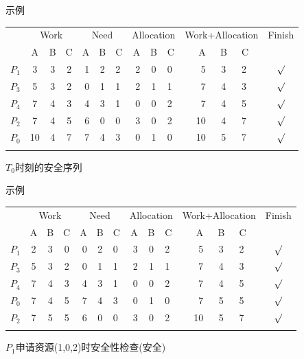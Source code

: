 \begin{frame}[fragile]{示例}
 \begin{center}
    \begin{tabular}{|c| c c c | r c l  |r c l |r c l | c |}
      \Xhline{1.1pt}
      ~ &  \multicolumn{3}{|c|}{Work} &  \multicolumn{3}{|c|}{Need} &  \multicolumn{3}{|c|}{Allocation} &  \multicolumn{3}{|c|}{Work+Allocation} & Finish \\ \cline{2-13}
      ~     & A  & B & C   &   A & B & C    &    A & B & C    &    A & B & C & \\ \Xhline{1pt}
      $P_1$ &  3 & 3 & 2   &   1 & 2 & 2    &    2 & 0 & 0    &    5 & 3 & 2 & $\surd$ \\ \hline
      $P_3$ &  5 & 3 & 2   &   0 & 1 & 1    &    2 & 1 & 1    &    7 & 4 & 3 & $\surd$ \\ \hline
      $P_4$ &  7 & 4 & 3   &   4 & 3 & 1    &    0 & 0 & 2    &    7 & 4 & 5 & $\surd$ \\ \hline
      $P_2$ &  7 & 4 & 5   &   6 & 0 & 0    &    3 & 0 & 2    &   10 & 4 & 7 & $\surd$ \\ \hline
      $P_0$ & 10 & 4 & 7   &   7 & 4 & 3    &    0 & 1 & 0    &   10 & 5 & 7 & $\surd$ \\ 
      \Xhline{1.1pt}
    \end{tabular}

    $T_0$时刻的安全序列
  \end{center}
\end{frame}


\begin{frame}[fragile]{示例}
 \begin{center}
    \begin{tabular}{|c| c c c | r c l  |r c l |r c l | c |}
      \Xhline{1.1pt}
      ~ &  \multicolumn{3}{|c|}{Work} &  \multicolumn{3}{|c|}{Need} &  \multicolumn{3}{|c|}{Allocation} &  \multicolumn{3}{|c|}{Work+Allocation} & Finish \\ \cline{2-13}
      ~     & A  & B & C   &   A & B & C    &    A & B & C    &    A & B & C & \\ \Xhline{1pt}
      $P_1$ &  2 & 3 & 0   &   0 & 2 & 0    &    3 & 0 & 2    &    5 & 3 & 2 & $\surd$ \\ \hline
      $P_3$ &  5 & 3 & 2   &   0 & 1 & 1    &    2 & 1 & 1    &    7 & 4 & 3 & $\surd$ \\ \hline
      $P_4$ &  7 & 4 & 3   &   4 & 3 & 1    &    0 & 0 & 2    &    7 & 4 & 5 & $\surd$ \\ \hline
      $P_0$ &  7 & 4 & 5   &   7 & 4 & 3    &    0 & 1 & 0    &    7 & 5 & 5 & $\surd$ \\ \hline
      $P_2$ &  7 & 5 & 5   &   6 & 0 & 0    &    3 & 0 & 2    &   10 & 5 & 7 & $\surd$ \\ 
      \Xhline{1.1pt}
    \end{tabular}

    $P_1$申请资源(1,0,2)时安全性检查(安全)
  \end{center}
\end{frame}

